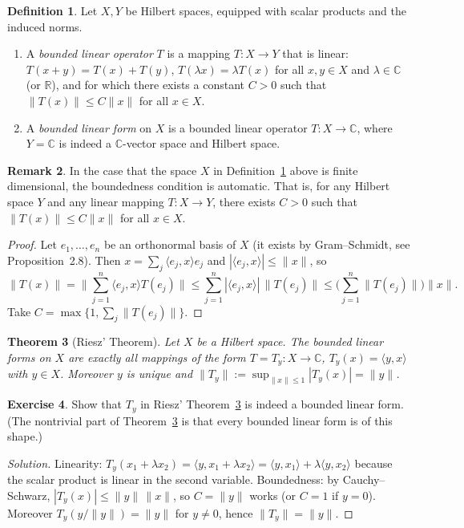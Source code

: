 \documentclass[11pt,a4paper]{article}
\numberwithin{equation}{section}
\newcommand{\R}{\mathbb{R}}
\newcommand{\C}{\mathbb{C}}
\newcommand{\ip}[2]{\langle #1, #2\rangle}
\theoremstyle{plain}
\newtheorem{theorem}{Theorem}[section]
\theoremstyle{definition}
\newtheorem{definition}[theorem]{Definition}
\newtheorem{exercise}[theorem]{Exercise}
\newtheorem{remark}[theorem]{Remark}
\theoremstyle{plain}
\theoremstyle{definition}
\newenvironment{solution}{\begin{proof}[Solution]}{\end{proof}}
\begin{document}
\begin{definition}\label{def:bdd}
Let $X,Y$ be Hilbert spaces, equipped with scalar products and the induced norms.
\begin{enumerate}
\item A \emph{bounded linear operator} $T$ is a mapping $T:X\to Y$ that is linear:
$T(x+y)=T(x)+T(y)$, $T(\lambda x)=\lambda T(x)$ for all $x,y\in X$ and $\lambda\in\C$ (or
$\R$), and for which there exists a constant $C>0$ such that $\|T(x)\|\le C\|x\|$ for all
$x\in X$.
\item A \emph{bounded linear form} on $X$ is a bounded linear operator $T:X\to\C$, where
$Y=\C$ is indeed a $\C$-vector space and Hilbert space.
\end{enumerate}
\end{definition}

\begin{remark}\label{rem:finitedim}
In the case that the space $X$ in Definition~\ref{def:bdd} above is finite dimensional, the
boundedness condition is automatic. That is, for any Hilbert space $Y$ and any linear
mapping $T:X\to Y$, there exists $C>0$ such that $\|T(x)\|\le C\|x\|$ for all $x\in X$.
\end{remark}
\begin{proof}
Let $e_1,\dots,e_n$ be an orthonormal basis of $X$ (it exists by Gram--Schmidt, see
Proposition~2.8). Then $x=\sum_j\ip{e_j}{x}e_j$ and $|\ip{e_j}{x}|\le\|x\|$, so
\[
\|T(x)\|=\Big\|\sum_{j=1}^n\ip{e_j}{x}T(e_j)\Big\|\le\sum_{j=1}^n|\ip{e_j}{x}|\,\|T(e_j)\|
\le\Big(\sum_{j=1}^n\|T(e_j)\|\Big)\|x\| .
\]
Take $C=\max\{1,\sum_j\|T(e_j)\|\}$.
\end{proof}

\begin{theorem}[Riesz' Theorem]\label{thm:Riesz}
Let $X$ be a Hilbert space. The bounded linear forms on $X$ are exactly all mappings of
the form $T=T_y:X\to\C$, $T_y(x)=\ip{y}{x}$ with $y\in X$. Moreover $y$ is unique and
$\|T_y\|:=\sup_{\|x\|\le1}|T_y(x)|=\|y\|$.
\end{theorem}

\begin{exercise}\label{exo:Ty}
Show that $T_y$ in Riesz' Theorem~\ref{thm:Riesz} is indeed a bounded linear form. (The
nontrivial part of Theorem~\ref{thm:Riesz} is that every bounded linear form is of this shape.)
\end{exercise}
\begin{solution}
Linearity: $T_y(x_1+\lambda x_2)=\ip{y}{x_1+\lambda x_2}=\ip{y}{x_1}+\lambda\ip{y}{x_2}$
because the scalar product is linear in the second variable. Boundedness: by
Cauchy--Schwarz, $|T_y(x)|\le\|y\|\,\|x\|$, so $C=\|y\|$ works (or $C=1$ if $y=0$).
Moreover $T_y(y/\|y\|)=\|y\|$ for $y\ne0$, hence $\|T_y\|=\|y\|$.
\end{solution}
\end{document}
